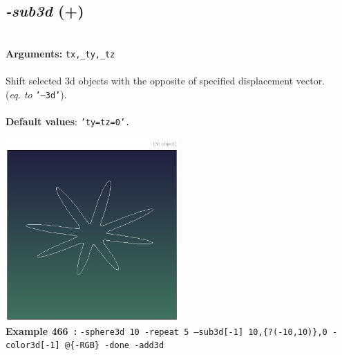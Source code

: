 \documentclass[a4paper,11pt,twoside]{book}
\begin{document}
\subsection{\emph{-sub3d} (+)}\vspace*{-0.5em}
~\\\textbf{Arguments: } 
{\small \texttt{tx,\_ty,\_tz}}\\~\\
Shift selected 3d objects with the opposite of specified displacement vector.
~\\(\emph{eq. to} {\small \texttt{'--3d'}}).
~\\~\\\textbf{Default values}: {\small \texttt{'ty=tz=0'.}}
\begin{center}\includegraphics[keepaspectratio=true,height=7cm,width=\textwidth]{img/gmic_def466.jpg}\\
{\footnotesize \textbf{Example 466~:} \texttt{-sphere3d 10 -repeat 5 --sub3d[-1] 10,\{?(-10,10)\},0 -color3d[-1] @\{-RGB\} -done -add3d}}
\end{center}
\end{document}

